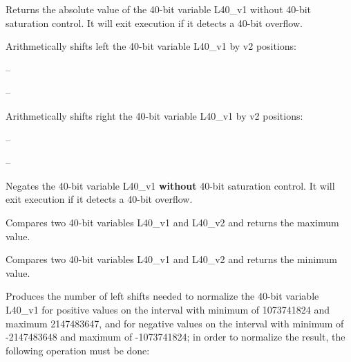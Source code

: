 Returns the absolute value of the 40-bit variable L40\_v1 without
40-bit saturation control.
It will exit execution if it detects a 40-bit overflow.


Arithmetically shifts left the 40-bit variable L40\_v1 by v2
positions:

 -- 

 -- 


Arithmetically shifts right the 40-bit variable L40\_v1 by v2
positions:

 -- 

 -- 


Negates the 40-bit variable L40\_v1 \textbf{without} 40-bit saturation
control. It will exit execution if it detects a 40-bit overflow.


Compares two 40-bit variables L40\_v1 and L40\_v2 and returns the
maximum value.


Compares two 40-bit variables L40\_v1 and L40\_v2 and returns the
minimum value.


Produces the number of left shifts needed to normalize the 40-bit
variable L40\_v1 for positive values on the interval with minimum
of 1073741824 and maximum 2147483647, and for negative values on
the interval with minimum of -2147483648 and maximum of
-1073741824; in order to normalize the result, the following
operation must be done:

